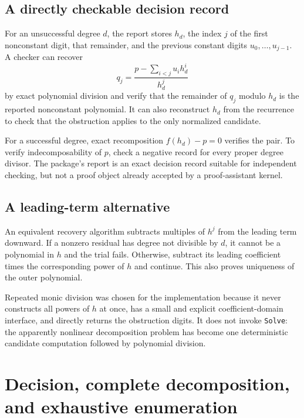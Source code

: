 \documentclass[11pt,letterpaper]{article}
\theoremstyle{definition}
\theoremstyle{remark}
\newcommand{\wt}[1]{\texttt{#1}}
\begin{document}
\subsection{A directly checkable decision record}
For an unsuccessful degree $d$, the report stores $h_d$, the index $j$
of the first nonconstant digit, that remainder, and the previous constant
digits $u_0,\ldots,u_{j-1}$. A checker can recover
\[
 q_j=\frac{p-\sum_{i<j}u_i h_d^i}{h_d^j}
\]
by exact polynomial division and verify that the remainder of $q_j$
modulo $h_d$ is the reported nonconstant polynomial.
It can also reconstruct $h_d$ from the recurrence to check that the
obstruction applies to the only normalized candidate.

For a successful degree, exact recomposition $f(h_d)-p=0$ verifies the
pair. To verify indecomposability of $p$, check a negative record for
every proper degree divisor. The package's report is an exact decision
record suitable for independent checking, but not a proof object already
accepted by a proof-assistant kernel.

\subsection{A leading-term alternative}
An equivalent recovery algorithm subtracts multiples of $h^j$ from the
leading term downward. If a nonzero residual has degree not divisible
by $d$, it cannot be a polynomial in $h$ and the trial fails. Otherwise,
subtract its leading coefficient times the corresponding power of $h$
and continue. This also proves uniqueness of the outer polynomial.

Repeated monic division was chosen for the implementation because it
never constructs all powers of $h$ at once, has a small and explicit
coefficient-domain interface, and directly returns the obstruction digits.
It does not invoke \wt{Solve}: the apparently nonlinear decomposition
problem has become one deterministic candidate computation followed by
polynomial division.

\section{Decision, complete decomposition, and exhaustive enumeration}
\label{sec:algorithms}
\end{document}
